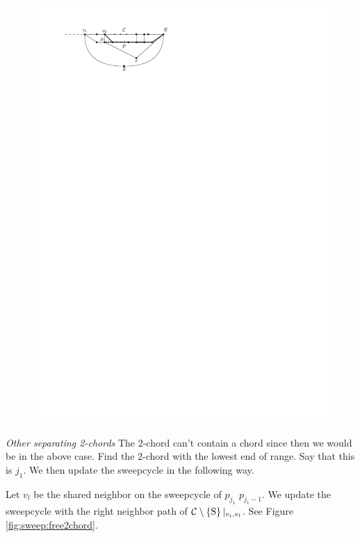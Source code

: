     \begin{figure}[h]
      \centering
      \includegraphics[scale=1]{unifiedAlgo/img/sweep/pEBound}
      \caption{}
      \label{fig:sweep:pEBound}
    \end{figure}
    \emph{Other separating 2-chords}
    The 2-chord can't contain a chord since then we would be in the above case.
    Find the $2$-chord with the lowest end of range. Say that this is $j_1$. We then update the sweepcycle in the following way.

    Let $v_l$ be the shared neighbor on the sweepcycle of $p_{j_1}$ $p_{j_1 -1}$. We update the sweepcycle with the right neighbor path of $\mathcal{C} \setminus \left\lbrace {\mathrm{S}} \right\rbrace|_{v_i, v_l}$. See Figure \ref{fig:sweep:free2chord}.

